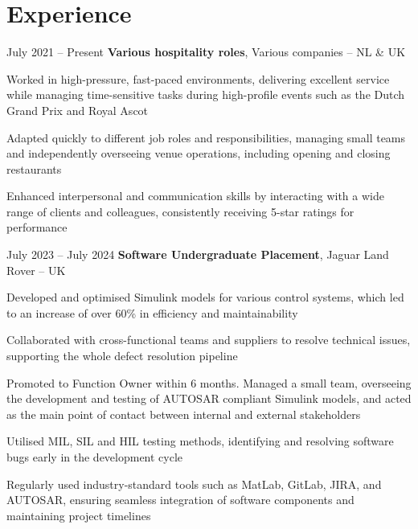 	\section{Experience}
	
	\begin{twocolentry}{
			July 2021 – Present
		}
		\textbf{Various hospitality roles}, Various companies -- NL \& UK
	\end{twocolentry}
	
	\vspace{0.10 cm}
	\begin{onecolentry}
		\begin{highlights}
			\item Worked in high-pressure, fast-paced environments, delivering excellent service while managing time-sensitive tasks during high-profile events such as the Dutch Grand Prix and Royal Ascot
			\item Adapted quickly to different job roles and responsibilities, managing small teams and independently overseeing venue operations, including opening and closing restaurants
			\item Enhanced interpersonal and communication skills by interacting with a wide range of clients and colleagues, consistently receiving 5-star ratings for performance
		\end{highlights}
	\end{onecolentry}
	
	\vspace{0.2 cm}
	
	\begin{twocolentry}{
			July 2023 – July 2024
		}
		\textbf{Software Undergraduate Placement}, Jaguar Land Rover -- UK
	\end{twocolentry}
	
	\vspace{0.10 cm}
	\begin{onecolentry}
		\begin{highlights}
			\item Developed and optimised Simulink models for various control systems, which led to an increase of over 60\% in efficiency and maintainability
			\item Collaborated with cross-functional teams and suppliers to resolve technical issues, supporting the whole defect resolution pipeline
			\item Promoted to Function Owner within 6 months. Managed a small team, overseeing the development and testing of AUTOSAR compliant Simulink models, and acted as the main point of contact between internal and external stakeholders
			\item Utilised MIL, SIL and HIL testing methods, identifying and resolving software bugs early in the development cycle
			\item Regularly used industry-standard tools such as MatLab, GitLab, JIRA, and AUTOSAR, ensuring seamless integration of software components and maintaining project timelines
		\end{highlights}
	\end{onecolentry}
	
